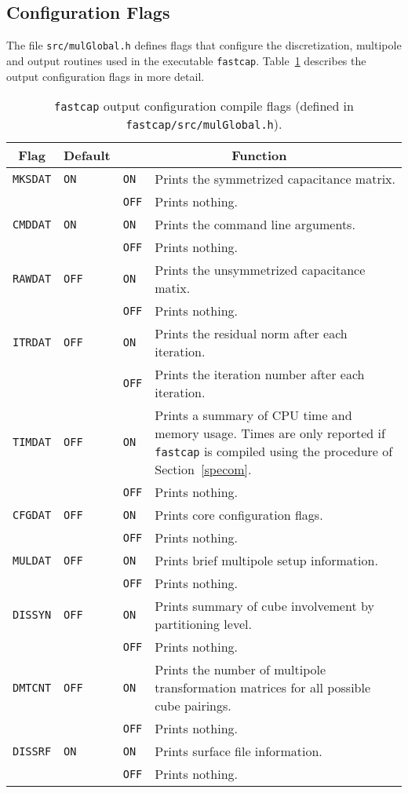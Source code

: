 \subsection{Configuration Flags}
\label{confla}

The file {\tt src/mulGlobal.h} defines 
flags that configure the discretization,
multipole and output routines used in the executable {\tt fastcap}. 
Table~\ref{outpu} describes the   output configuration flags in more detail.
\begin{table}
\begin{center}
\begin{tabular}{lllp{3.5in}}\hline
\multicolumn{1}{c}{Flag}& \multicolumn{1}{c}{Default} 
&\multicolumn{2}{c}{Function}\\\hline
{\tt MKSDAT} & {\tt ON} & {\tt ON} & Prints the symmetrized capacitance matrix.\\
&& {\tt OFF} & Prints nothing.\\
{\tt CMDDAT} & {\tt ON} & {\tt ON} & Prints the command line arguments.\\
&& {\tt OFF} & Prints nothing.\\
{\tt RAWDAT} & {\tt OFF} & {\tt ON} & Prints the unsymmetrized capacitance matix.\\
&& {\tt OFF} & Prints nothing.\\
{\tt ITRDAT} & {\tt OFF} & {\tt ON} & Prints the residual norm after each iteration.\\
&& {\tt OFF} & Prints the iteration number after each iteration.\\
{\tt TIMDAT} & {\tt OFF} & {\tt ON} & Prints a summary of CPU time and memory usage. Times are
only reported if {\tt fastcap} is compiled using the procedure of 
Section~\ref{specom}.\\
&& {\tt OFF} & Prints nothing.\\
{\tt CFGDAT} & {\tt OFF} & {\tt ON} & Prints core configuration flags.\\
&& {\tt OFF} & Prints nothing.\\
{\tt MULDAT} & {\tt OFF} & {\tt ON} & Prints brief multipole setup information.\\
&& {\tt OFF} & Prints nothing.\\
{\tt DISSYN} & {\tt OFF} & {\tt ON} & Prints summary of cube involvement by partitioning level.\\
&& {\tt OFF} & Prints nothing.\\
{\tt DMTCNT} & {\tt OFF} & {\tt ON} & Prints the number of multipole transformation matrices for all possible cube pairings.\\
&& {\tt OFF} & Prints nothing.\\
{\tt DISSRF} & {\tt ON} & {\tt ON} & Prints surface file information.\\
&& {\tt OFF} & Prints nothing.\\\hline
\end{tabular}
\end{center}
\caption{{\tt fastcap} output configuration compile flags (defined in {\tt fastcap/src/mulGlobal.h}).}
\label{outpu}
\end{table}

